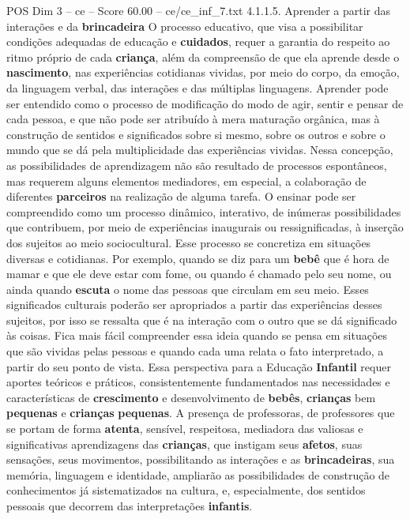 \begin{textsample}{POS Dim 3 – ce – Score 60.00 – ce/ce\_inf\_7.txt}  \label{ex:f3_pos_051}
4.1.1.5.
Aprender a partir das interações e da \textbf{brincadeira} O processo educativo, que visa a possibilitar condições adequadas de educação e \textbf{cuidados}, requer a garantia do respeito ao ritmo próprio de cada \textbf{criança}, além da compreensão de que ela aprende desde o \textbf{nascimento}, nas experiências cotidianas vividas, por meio do corpo, da emoção, da linguagem verbal, das interações e das múltiplas linguagens.
Aprender pode ser entendido como o processo de modificação do modo de agir, sentir e pensar de cada pessoa, e que não pode ser atribuído à mera maturação orgânica, mas à construção de sentidos e significados sobre si mesmo, sobre os outros e sobre o mundo que se dá pela multiplicidade das experiências vividas.
Nessa concepção, as possibilidades de aprendizagem não são resultado de processos espontâneos, mas requerem alguns elementos mediadores, em especial, a colaboração de diferentes \textbf{parceiros} na realização de alguma tarefa.
O ensinar pode ser compreendido como um processo dinâmico, interativo, de inúmeras possibilidades que contribuem, por meio de experiências inaugurais ou ressignificadas, à inserção dos sujeitos ao meio sociocultural.
Esse processo se concretiza em situações diversas e cotidianas.
Por exemplo, quando se diz para um \textbf{bebê} que é hora de mamar e que ele deve estar com fome, ou quando é chamado pelo seu nome, ou ainda quando \textbf{escuta} o nome das pessoas que circulam em seu meio.
Esses significados culturais poderão ser apropriados a partir das experiências desses sujeitos, por isso se ressalta que é na interação com o outro que se dá significado às coisas.
Fica mais fácil compreender essa ideia quando se pensa em situações que são vividas pelas pessoas e quando cada uma relata o fato interpretado, a partir do seu ponto de vista.
Essa perspectiva para a Educação \textbf{Infantil} requer aportes teóricos e práticos, consistentemente fundamentados nas necessidades e características de \textbf{crescimento} e desenvolvimento de \textbf{bebês}, \textbf{crianças} bem \textbf{pequenas} e \textbf{crianças} \textbf{pequenas}.
A presença de professoras, de professores que se portam de forma \textbf{atenta}, sensível, respeitosa, mediadora das valiosas e significativas aprendizagens das \textbf{crianças}, que instigam seus \textbf{afetos}, suas sensações, seus movimentos, possibilitando as interações e as \textbf{brincadeiras}, sua memória, linguagem e identidade, ampliarão as possibilidades de construção de conhecimentos já sistematizados na cultura, e, especialmente, dos sentidos pessoais que decorrem das interpretações \textbf{infantis}.

\end{textsample}
